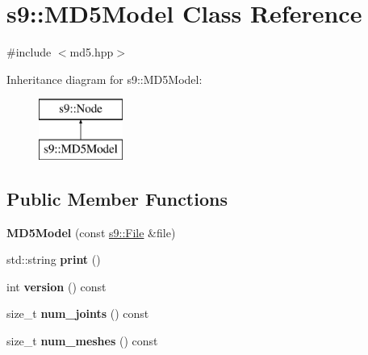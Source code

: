 \hypertarget{classs9_1_1MD5Model}{\section{s9\-:\-:M\-D5\-Model Class Reference}
\label{classs9_1_1MD5Model}
}


{\ttfamily \#include $<$md5.\-hpp$>$}

Inheritance diagram for s9\-:\-:M\-D5\-Model\-:\begin{figure}[H]
\begin{center}
\leavevmode
\includegraphics[height=2.000000cm]{classs9_1_1MD5Model}
\end{center}
\end{figure}
\subsection*{Public Member Functions}
\begin{DoxyCompactItemize}
\item 
\hypertarget{classs9_1_1MD5Model_a8fda33653cc483dd85d3d8b79e4904a2}{{\bfseries M\-D5\-Model} (const \hyperlink{classs9_1_1File}{s9\-::\-File} \&file)}\label{classs9_1_1MD5Model_a8fda33653cc483dd85d3d8b79e4904a2}

\item 
\hypertarget{classs9_1_1MD5Model_af1d8ef363c03ee80ef9339987f3ed29b}{std\-::string {\bfseries print} ()}\label{classs9_1_1MD5Model_af1d8ef363c03ee80ef9339987f3ed29b}

\item 
\hypertarget{classs9_1_1MD5Model_a82fedccd13a968c94c06b5edad9e22b0}{int {\bfseries version} () const }\label{classs9_1_1MD5Model_a82fedccd13a968c94c06b5edad9e22b0}

\item 
\hypertarget{classs9_1_1MD5Model_a6cbe036a44ed920c171b91be43944d79}{size\-\_\-t {\bfseries num\-\_\-joints} () const }\label{classs9_1_1MD5Model_a6cbe036a44ed920c171b91be43944d79}

\item 
\hypertarget{classs9_1_1MD5Model_a40e37ca6659141783d7d7f6d30e5fe20}{size\-\_\-t {\bfseries num\-\_\-meshes} () const }\label{classs9_1_1MD5Model_a40e37ca6659141783d7d7f6d30e5fe20}

\end{DoxyCompactItemize}
